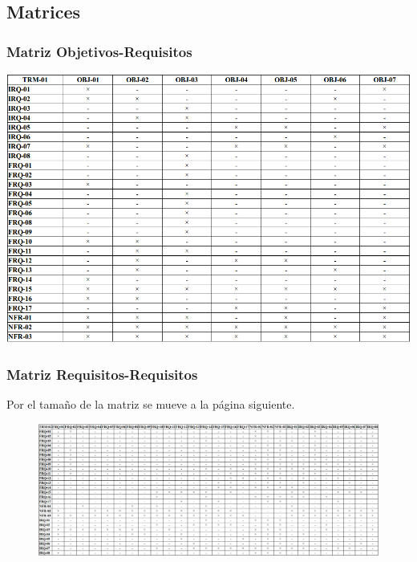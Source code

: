 \subsection{Matrices}

\subsubsection{Matriz Objetivos-Requisitos}
\includegraphics{img/tables/obj-req.png}

\subsubsection{Matriz Requisitos-Requisitos}

Por el tamaño de la matriz se mueve a la página siguiente.

\clearpage

\begin{figure}
    \includegraphics[width=\textwidth]{img/tables/req-req.png}
\end{figure}

\clearpage
